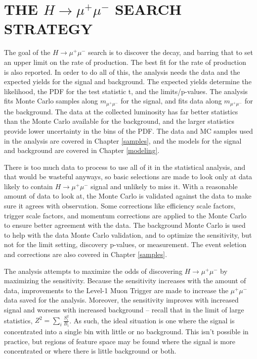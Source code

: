 \chapter{THE $H\rightarrow\mu^+\mu^-$ SEARCH STRATEGY} \label{strategy}

The goal of the $H\rightarrow\mu^+\mu^-$ search is to discover the decay, and barring that to set an upper limit on the rate of production. The best fit for the rate of production is also reported. In order to do all of this, the analysis needs the data and the expected yields for the signal and background. The expected yields determine the likelihood, the PDF for the test statistic t, and the limits/p-values. The analysis fits Monte Carlo samples along $m_{\mu^+\mu^-}$ for the signal, and fits data along $m_{\mu^+\mu^-}$ for the background. The data at the collected luminosity has far better statistics than the Monte Carlo available for the background, and the larger statistics provide lower uncertainty in the bins of the PDF. The data and MC samples used in the analysis are covered in Chapter \ref{samples}, and the models for the signal and background are covered in Chapter \ref{modeling}. 

There is too much data to process to use all of it in the statistical analysis, and that would be wasteful anyways, so basic selections are made to look only at data likely to contain $H\rightarrow\mu^+\mu^-$ signal and unlikely to miss it. With a reasonable amount of data to look at, the Monte Carlo is validated against the data to make sure it agrees with observation. Some corrections like efficiency scale factors, trigger scale factors, and momentum corrections are applied to the Monte Carlo to ensure better agreement with the data. The background Monte Carlo is used to help with the data Monte Carlo validation, and to optimize the sensitivity, but not for the limit setting, discovery p-values, or measurement. The event seletion and corrections are also covered in Chapter \ref{samples}. 

The analysis attempts to maximize the odds of discovering $H\rightarrow\mu^+\mu^-$ by maximizing the sensitivity. Because the sensitivity increases with the amount of data, improvements to the Level-1 Muon Trigger are made to increase the $\mu^+\mu^-$ data saved for the analysis. Moreover, the sensitivity improves with increased signal and worsens with increased background -- recall that in the limit of large statistics, $Z^2=\sum_i\frac{S_i^2}{B_i}$. As such, the ideal situation is one where the signal is concentrated into a single bin with little or no background. This isn't possible in practice, but regions of feature space may be found where the signal is more concentrated or where there is little background or both. 

